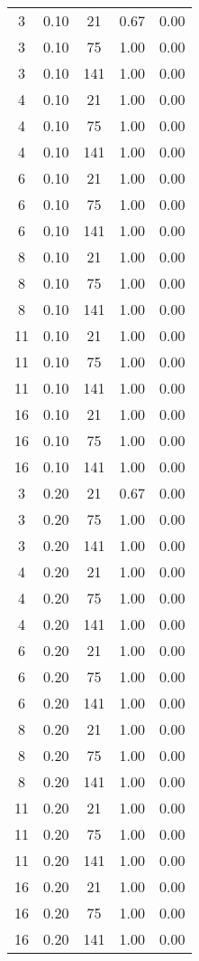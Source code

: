 \documentclass[10pt,a4paper]{article}
\begin{document}
\begin{center}
\begin{longtable}{ccccc}
3  & 0.10 & 21  & 0.67 & 0.00 \\
3  & 0.10 & 75  & 1.00 & 0.00 \\
3  & 0.10 & 141 & 1.00 & 0.00 \\
4  & 0.10 & 21  & 1.00 & 0.00 \\
4  & 0.10 & 75  & 1.00 & 0.00 \\
4  & 0.10 & 141 & 1.00 & 0.00 \\
6  & 0.10 & 21  & 1.00 & 0.00 \\
6  & 0.10 & 75  & 1.00 & 0.00 \\
6  & 0.10 & 141 & 1.00 & 0.00 \\
8  & 0.10 & 21  & 1.00 & 0.00 \\
8  & 0.10 & 75  & 1.00 & 0.00 \\
8  & 0.10 & 141 & 1.00 & 0.00 \\
11 & 0.10 & 21  & 1.00 & 0.00 \\
11 & 0.10 & 75  & 1.00 & 0.00 \\
11 & 0.10 & 141 & 1.00 & 0.00 \\
16 & 0.10 & 21  & 1.00 & 0.00 \\
16 & 0.10 & 75  & 1.00 & 0.00 \\
16 & 0.10 & 141 & 1.00 & 0.00 \\
3  & 0.20 & 21  & 0.67 & 0.00 \\
3  & 0.20 & 75  & 1.00 & 0.00 \\
3  & 0.20 & 141 & 1.00 & 0.00 \\
4  & 0.20 & 21  & 1.00 & 0.00 \\
4  & 0.20 & 75  & 1.00 & 0.00 \\
4  & 0.20 & 141 & 1.00 & 0.00 \\
6  & 0.20 & 21  & 1.00 & 0.00 \\
6  & 0.20 & 75  & 1.00 & 0.00 \\
6  & 0.20 & 141 & 1.00 & 0.00 \\
8  & 0.20 & 21  & 1.00 & 0.00 \\
8  & 0.20 & 75  & 1.00 & 0.00 \\
8  & 0.20 & 141 & 1.00 & 0.00 \\
11 & 0.20 & 21  & 1.00 & 0.00 \\
11 & 0.20 & 75  & 1.00 & 0.00 \\
11 & 0.20 & 141 & 1.00 & 0.00 \\
16 & 0.20 & 21  & 1.00 & 0.00 \\
16 & 0.20 & 75  & 1.00 & 0.00 \\
16 & 0.20 & 141 & 1.00 & 0.00 \\

\end{longtable}
\end{center}
\end{document}
